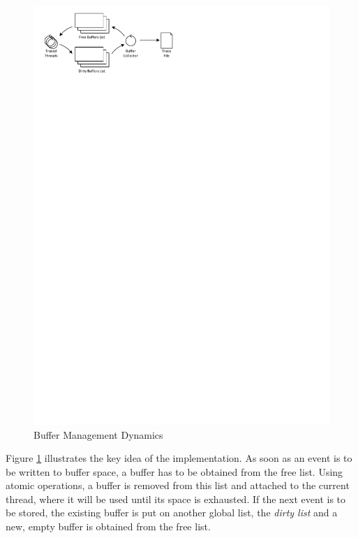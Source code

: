 \begin{figure}[htbp] 
\begin{centering} 
\includegraphics[scale=1, clip=true, viewport=0cm 24.5cm 10.5cm 30cm]{images/diagrams/BufferDynamics.pdf} 
\caption{Buffer Management Dynamics} 
\label{BufferDynamics} 
\end{centering} 
\end{figure}

Figure \ref{BufferDynamics} illustrates the key idea of the implementation. As soon as an event is
to be written to buffer space, a buffer has to be obtained from the free list.
Using atomic operations, a buffer is removed from this list and attached to the
current thread, where it will be used until its space is exhausted. If the next event
is to be stored, the existing buffer is put on another global list, the \emph{dirty list}
and a new, empty buffer is obtained from the free list.

